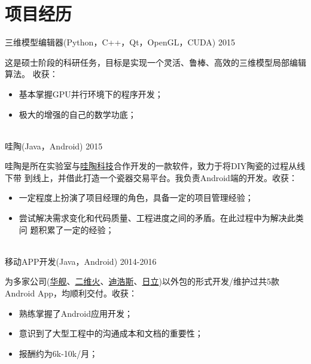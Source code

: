 \documentclass[print]{friggeri-cv_cn} %
\begin{document}
\section{项目经历}
\begin{entrylist}

\entry
{三维模型编辑器(Python，C++，Qt，OpenGL，CUDA)}
{2015}
{这是硕士阶段的科研任务，目标是实现一个灵活、鲁棒、高效的三维模型局部编辑算法。
    收获：
\begin{itemize}

    \item 基本掌握GPU并行环境下的程序开发；
    \item 极大的增强的自己的数学功底；
\end{itemize}}
\\
\entry
{哇陶(Java，Android)}
{2015}
{哇陶是所在实验室与\href{http://wowtao.me/index.html}{哇陶科技}合作开发的一款软件，致力于将DIY陶瓷的过程从线下带
    到线上，并借此打造一个瓷器交易平台。我负责Android端的开发。收获：
\begin{itemize}
    \item 一定程度上扮演了项目经理的角色，具备一定的项目管理经验；
    \item 尝试解决需求变化和代码质量、工程进度之间的矛盾。在此过程中为解决此类问
        题积累了一定的经验；
\end{itemize}}
\\
\entry
{移动APP开发(Java，Android)}
{2014-2016}
{为多家公司(\href{http://www.hjtechcn.cn/}{华舰}、\href{http://www.2dfire.com/}{二维火}、\href{http://d-controls.com/}{迪浩斯}、\href{http://www.hisensehitachi.com/}{日立})以外包的形式开发/维护过共5款Android App，均顺利交付。收获：
\begin{itemize}
    \item 熟练掌握了Android应用开发；
    \item 意识到了大型工程中的沟通成本和文档的重要性；
    \item 报酬约为6k-10k/月；
\end{itemize}}

\end{entrylist}
\end{document}
